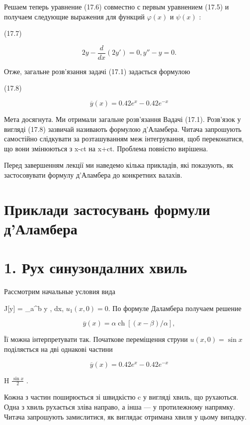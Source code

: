 \documentclass[
  ukrainian,
]{article}
\begin{document}
Решаем теперь уравнение (17.6) совместно с первым уравнением (17.5) и
получаем следующие выражения для функций \(\varphi(x)\) и \(\psi(x)\) :

(17.7)

\[
2y - \frac{d}{dx}(2y') = 0,
y'' - y = 0.
\]

Отже, загальне розв'язання задачі (17.1) задається формулою

(17.8)

\[
\overline{y}(x) = 0.42e^x - 0.42e^{-x}
\]

Мета досягнута. Ми отримали загальне розв'язання Вадачі (17.1).
Розв'язок у вигляді (17.8) зазвичай називають формулою д'Аламбера.
Читача запрошують самостійно слідкувати за розташуванням меж
інтегрування, щоб переконатися, що вони змінюються з x-ct на x+ct.
Проблема повністю вирішена.

Перед завершенням лекції ми наведемо кілька прикладів, які показують, як
застосовувати формулу д'Аламбера до конкретних валахів.

\section{Приклади застосувань формули
д'Аламбера}\label{ux43fux440ux438ux43aux43bux430ux434ux438-ux437ux430ux441ux442ux43eux441ux443ux432ux430ux43dux44c-ux444ux43eux440ux43cux443ux43bux438-ux434ux430ux43bux430ux43cux431ux435ux440ux430}

\section{1. Рух синузондалних
хвиль}\label{ux440ux443ux445-ux441ux438ux43dux443ux437ux43eux43dux434ux430ux43bux43dux438ux445-ux445ux432ux438ux43bux44c}

Рассмотрим начальные условия вида

J{[}y{]} = \int\_a\^{}b y  , dx, \(u_1(x, 0) = 0.\) По
формуле Даламбера получаем решение

\[
\overline{y}(x) = \alpha \operatorname{ch}[(x-\beta)/\alpha],
\]

Її можна інтерпретувати так. Початкове переміщення струни
\(u(x, 0) = \sin x\) поділяється на дві однакові частини

\[
\overline{y}(x) = 0.42e^x - 0.42e^{-x}
\]

H \(\frac{\sin x}{2}\) .

Кожна з частин поширюється зі швидкістю c у вигляді хвиль, що рухаються.
Одна з хвиль рухається зліва направо, а інша --- у протилежному
напрямку. Читача запрошують замислитися, як виглядає отримана хвиля у
цьому випадку.
\end{document}
